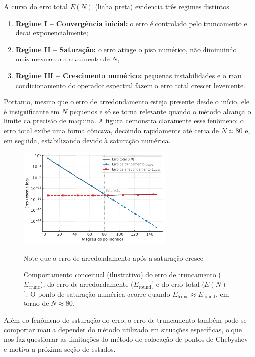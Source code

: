 \documentclass[11pt,a4paper]{article}
\begin{document}
A curva do erro total $E(N)$ (linha preta) evidencia três regimes distintos:

\begin{enumerate}
    \item \textbf{Regime I – Convergência inicial:} o erro é controlado pelo truncamento e decai exponencialmente;
    \item \textbf{Regime II – Saturação:} o erro atinge o piso numérico, não diminuindo mais mesmo com o aumento de $N$;
    \item \textbf{Regime III – Crescimento numérico:} pequenas instabilidades e o mau condicionamento do operador espectral fazem o erro total crescer levemente.
\end{enumerate}

Portanto, mesmo que o erro de arredondamento esteja presente desde o início, ele é insignificante em $N$ pequenos e só se torna relevante quando o método alcança o limite da precisão de máquina.  
A figura demonstra claramente esse fenômeno: o erro total exibe uma forma côncava, decaindo rapidamente até cerca de $N \approx 80$ e, em seguida, estabilizando devido à saturação numérica.

\begin{figure}[H]
    \centering
    \includegraphics[width=0.68\textwidth]{figures/fig_erro_teorico.png}
    \caption{Comportamento conceitual (ilustrativo) do erro de truncamento ($E_{\mathrm{trunc}}$), do erro de arredondamento ($E_{\mathrm{round}}$) e do erro total ($E(N)$). O ponto de saturação numérica ocorre quando $E_{\mathrm{trunc}} \approx E_{\mathrm{round}}$, em torno de $N \approx 80$.} Note que o erro de arredondamento após a saturação cresce.
    \label{fig:erro_teorico_componentes_final}
\end{figure}

Além do fenômeno de saturação do erro, o erro de truncamento também pode se comportar mau a depender do método utilizado em situações específicas, o que nos faz questionar as limitações do método de colocação de pontos de Chebyshev e motiva a próxima seção de estudos.
\end{document}

